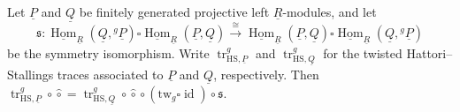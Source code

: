 \documentclass[11pt,oneside]{amsart}
\DeclareMathOperator{\Hom}{Hom}
\DeclareMathOperator{\id}{id}
\numberwithin{equation}{section}
\numberwithin{figure}{section}
\theoremstyle{plain}
\theoremstyle{definition}
\theoremstyle{remark}
\begin{document}
\begin{prop}
\label{prop:eq-algebraic-sliding}
Let \(\underline P\) and \(\underline Q\) be finitely generated
projective left \(\underline R\)-modules, and let
\[
\mathfrak{s}\colon
\underline{\Hom}_{\underline R}(\underline Q,{}^g\underline P)
\square
\underline{\Hom}_{\underline R}(\underline P,\underline Q)
\xrightarrow{\cong}
\underline{\Hom}_{\underline R}(\underline P,\underline Q)
\square
\underline{\Hom}_{\underline R}(\underline Q,{}^g\underline P)
\]
be the symmetry isomorphism. Write
\(\operatorname{tr}_{\mathrm{HS},\underline P}^g\) and
\(\operatorname{tr}_{\mathrm{HS},\underline Q}^g\)
for the twisted Hattori--Stallings traces associated to
\(\underline P\) and \(\underline Q\), respectively. Then
\(\operatorname{tr}_{\mathrm{HS},\underline P}^g\circ\hat\circ
=
\operatorname{tr}_{\mathrm{HS},\underline Q}^g
\circ\hat\circ
\circ(\mathrm{tw}_g\square\id)
\circ\mathfrak{s}.
\)
\end{prop}
\end{document}
